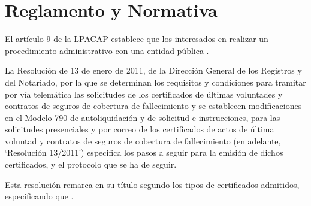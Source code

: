\section{Reglamento y Normativa}

El artículo 9 de la LPACAP \cite{LPACAP} establece que los interesados en realizar un procedimiento administrativo con una entidad pública .

La Resolución de 13 de enero de 2011, de la Dirección General de los Registros y del Notariado, por la que se determinan los requisitos y condiciones para tramitar por vía telemática las solicitudes de los certificados de últimas voluntades y contratos de seguros de cobertura de fallecimiento y se establecen modificaciones en el Modelo 790 de autoliquidación y de solicitud e instrucciones, para las solicitudes presenciales y por correo de los certificados de actos de última voluntad y contratos de seguros de cobertura de fallecimiento \cite{Resolucion132011} (en adelante, `Resolución 13/2011') especifica los pasos a seguir para la emisión de dichos certificados, y el protocolo que se ha de seguir.

Esta resolución remarca en su título segundo los tipos de certificados admitidos, especificando que .